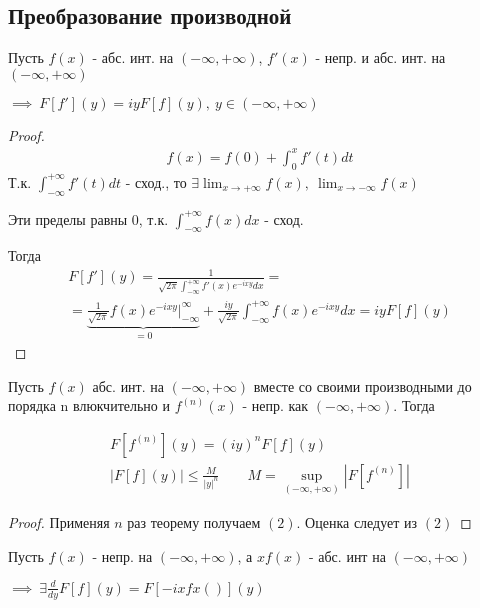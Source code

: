 \documentclass{article}
\begin{document}
\subsection{Преобразование производной}
\begin{theorem}
  Пусть $f(x)$ - абс. инт. на $(-\infty,+\infty)$, $f'(x)$ - непр. и абс. инт. на $(-\infty,+\infty)$

  $\implies \ F[f'](y)=iyF[f](y), \ y \in (-\infty,+\infty)$
\end{theorem}
\begin{proof}
  \begin{gather*}
    f(x)=f(0)+\int_{0}^{x}f'(t)dt
  \end{gather*}
  Т.к. $\int_{-\infty}^{+\infty}f'(t)dt$ - сход., то $\exists \lim_{x\to +\infty}f(x),\ \lim_{x\to -\infty}f(x)$

  Эти пределы равны $0$, т.к. $\int_{-\infty}^{+\infty}f(x)dx$ - сход.

  Тогда
  \begin{gather*}
    F[f'](y)=\frac{1}{\sqrt{2\pi}\int_{-\infty}^{+\infty}f'(x)e^{-ixy}dx}= \\ 
    = \underbrace{\frac{1}{\sqrt{2\pi}}f(x)e^{-ixy}\big|_{-\infty}^{\infty}}_{=0}+\frac{iy}{\sqrt{2\pi}}\int_{-\infty}^{+\infty}f(x)e^{-ixy}dx = iyF[f](y)
  \end{gather*}
\end{proof}
\begin{corollary}
  Пусть $f(x)$ абс. инт. на $(-\infty,+\infty)$ вместе со своими производными до порядка n влюкчительно и
  $f^{(n)}(x)$ - непр. как $(-\infty,+\infty)$. Тогда

  \begin{gather*}
    F[f^{(n)}](y)=(iy)^{n}F[f](y) \tag {2} \\ 
    |F[f](y)| \le \frac{M}{|y|^{n}} \qquad M=\sup_{(-\infty,+\infty)}|F[f^{(n)}]| \tag{3}
  \end{gather*}
\end{corollary}
\begin{proof}
  Применяя $n$ раз теорему получаем $(2)$. Оценка следует из $(2)$
\end{proof}
\begin{theorem}
  \phantom{.}

  Пусть $f(x)$ - непр. на $(-\infty,+\infty)$, а $xf(x)$ - абс. инт на $(-\infty,+\infty)$

  $\implies \ \exists \frac{d}{dy}F[f](y)=F[-ixfx()](y)$
\end{theorem}
\end{document}
